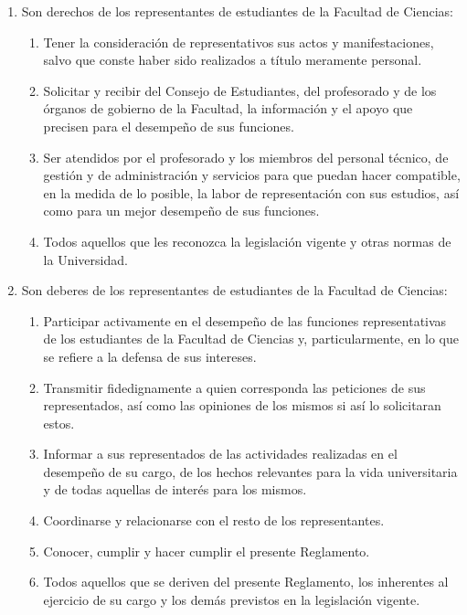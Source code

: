 \documentclass[11pt,a4paper]{article}
\begin{document}
\begin{enumerate}
\item Son derechos de los representantes de estudiantes de la Facultad de Ciencias:
  \begin{enumerate}
    \item Tener la consideración de representativos sus actos y manifestaciones, salvo que conste haber sido realizados a título meramente personal.
    \item Solicitar y recibir del Consejo de Estudiantes, del profesorado y de los órganos de gobierno de la Facultad, la información y el apoyo que precisen para el desempeño de sus funciones.
    \item Ser atendidos por el profesorado y los miembros del personal técnico, de gestión y de administración y servicios para que puedan hacer compatible, en la medida de lo posible, la labor de representación con sus estudios, así como para un mejor desempeño de sus funciones.
    \item Todos aquellos que les reconozca la legislación vigente y otras normas de la Universidad.
  \end{enumerate}
\item Son deberes de los representantes de estudiantes de la Facultad de Ciencias:
  \begin{enumerate}
    \item Participar activamente en el desempeño de las funciones representativas de los estudiantes de la Facultad de Ciencias y, particularmente, en lo que se refiere a la defensa de sus intereses.
    \item Transmitir fidedignamente a quien corresponda las peticiones de sus representados, así como las opiniones de los mismos si así lo solicitaran estos.
    \item Informar a sus representados de las actividades realizadas en el desempeño de su cargo, de los hechos relevantes para la vida universitaria y de todas aquellas de interés para los mismos.
    \item Coordinarse y relacionarse con el resto de los representantes.
    \item Conocer, cumplir y hacer cumplir el presente Reglamento.
    \item Todos aquellos que se deriven del presente Reglamento, los inherentes al ejercicio de su cargo y los demás previstos en la legislación vigente.
  \end{enumerate}
\end{enumerate}
\end{document}
